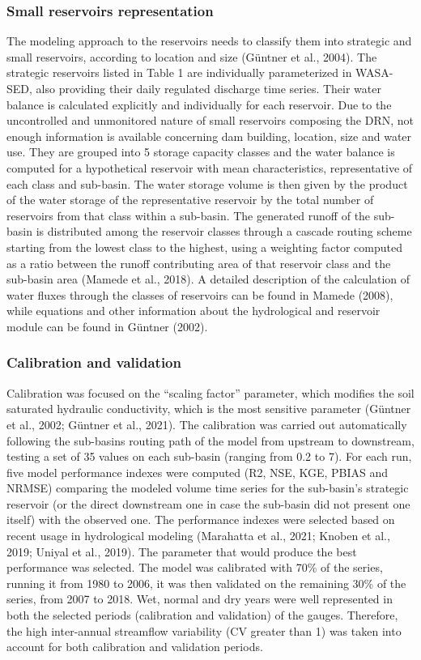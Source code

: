 \documentclass[draft]{agujournal2019}
\begin{document}
\subsubsection{Small reservoirs representation}
The modeling approach to the reservoirs needs to classify them into strategic and small reservoirs, according to location and size (Güntner et al., 2004). The strategic reservoirs listed in Table 1 are individually parameterized in WASA-SED, also providing their daily regulated discharge time series. Their water balance is calculated explicitly and individually for each reservoir. Due to the uncontrolled and unmonitored nature of small reservoirs composing the DRN, not enough information is available concerning dam building, location, size and water use. They are grouped into 5 storage capacity classes and the water balance is computed for a hypothetical reservoir with mean characteristics, representative of each class and sub-basin. The water storage volume is then given by the product of the water storage of the representative reservoir by the total number of reservoirs from that class within a sub-basin. The generated runoff of the sub-basin is distributed among the reservoir classes through a cascade routing scheme starting from the lowest class to the highest, using a weighting factor computed as a ratio between the runoff contributing area of that reservoir class and the sub-basin area (Mamede et al., 2018). A detailed description of the calculation of water fluxes through the classes of reservoirs can be found in Mamede (2008), while equations and other information about the hydrological and reservoir module can be found in Güntner (2002).

\subsubsection{Calibration and validation}
Calibration was focused on the “scaling factor” parameter, which modifies the soil saturated hydraulic conductivity, which is the most sensitive parameter  (Güntner et al., 2002; Güntner et al., 2021). The calibration was carried out automatically following the sub-basins routing path of the model from upstream to downstream, testing a set of 35 values on each sub-basin (ranging from 0.2 to 7). For each run, five model performance indexes were computed (R2, NSE, KGE, PBIAS and NRMSE) comparing the modeled volume time series for the sub-basin’s strategic reservoir (or the direct downstream one in case the sub-basin did not present one itself) with the observed one. The performance indexes were selected based on recent usage in hydrological modeling (Marahatta et al., 2021; Knoben et al., 2019; Uniyal et al., 2019). The parameter that would produce the best performance was selected. The model was calibrated with 70\% of the series, running it from 1980 to 2006, it was then validated on the remaining 30\% of the series, from 2007 to 2018. Wet, normal and dry years were well represented in both the selected periods (calibration and validation) of the gauges. Therefore, the high inter-annual streamflow variability (CV greater than 1) was taken into account for both calibration and validation periods.
\end{document}
